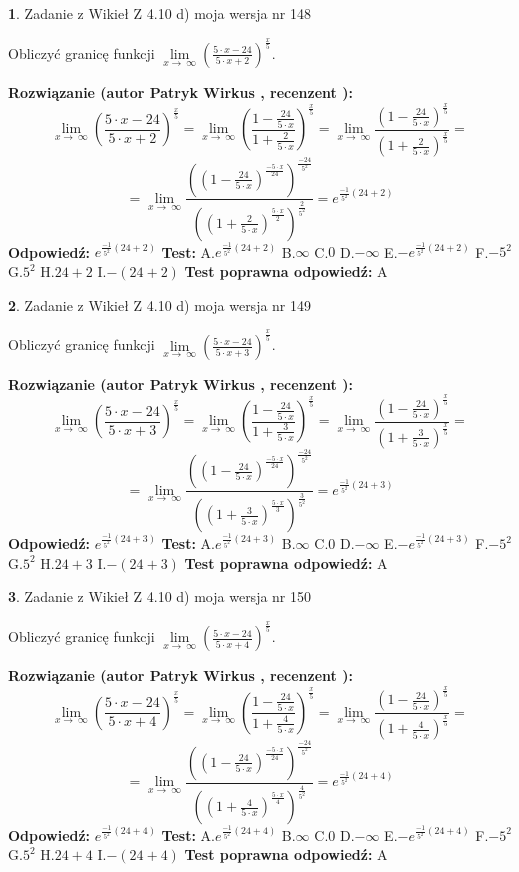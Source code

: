\documentclass[12pt, a4paper]{article}
\theoremstyle{definition} %
\newtheorem{zad}{}
\newcommand{\zadStart}[1]{\begin{zad}#1\newline}
\newcommand{\zadStop}{\end{zad}}
\newcommand{\rozwStart}[2]{\noindent \textbf{Rozwiązanie (autor #1 , recenzent #2): }\newline}
\newcommand{\rozwStop}{\newline}
\newcommand{\odpStart}{\noindent \textbf{Odpowiedź:}\newline}
\newcommand{\odpStop}{\newline}
\newcommand{\testStart}{\noindent \textbf{Test:}\newline}
\newcommand{\testStop}{\newline}
\newcommand{\kluczStart}{\noindent \textbf{Test poprawna odpowiedź:}\newline}
\newcommand{\kluczStop}{\newline}
\begin{document}
\zadStart{Zadanie z Wikieł Z 4.10 d) moja wersja nr 148}


Obliczyć granicę funkcji  $\lim\limits_{x\to\ \infty}(\frac{5\cdot x-24}{5\cdot x+2})^{\frac{x}{5}}$.
\zadStop
\rozwStart{Patryk Wirkus}{}
$$\lim\limits_{x\to\ \infty}(\frac{5\cdot x-24}{5\cdot x+2})^{\frac{x}{5}} = \lim\limits_{x\to\ \infty}(\frac{1-\frac{24}{5\cdot x}}{1+\frac{2}{5\cdot x}})^{\frac{x}{5}}=\lim\limits_{x\to\ \infty}\frac{(1-\frac{24}{5\cdot x})^{\frac{x}{5}}}{(1+\frac{2}{5\cdot x})^{\frac{x}{5}}}=$$
$$=\lim\limits_{x\to\ \infty}\frac{((1-\frac{24}{5\cdot x})^{\frac{-5\cdot x}{24}})^{\frac{-24}{5^{2}}}}{((1+\frac{2}{5\cdot x})^{\frac{5\cdot x}{2}})^{\frac{2}{5^{2}}}}=e^{\frac{-1}{5^{2}}(24+2)}$$
\rozwStop
\odpStart
$e^{\frac{-1}{5^{2}}(24+2)}$
\odpStop
\testStart
A.$e^{\frac{-1}{5^{2}}(24+2)}$ B.$\infty$ C.$0$ D.$-\infty$ E.$-e^{\frac{-1}{5^{2}}(24+2)}$
F.$-5^{2}$ G.$5^{2}$
H.$24+2$
I.$-(24+2)$
\testStop
\kluczStart
A
\kluczStop



\zadStart{Zadanie z Wikieł Z 4.10 d) moja wersja nr 149}


Obliczyć granicę funkcji  $\lim\limits_{x\to\ \infty}(\frac{5\cdot x-24}{5\cdot x+3})^{\frac{x}{5}}$.
\zadStop
\rozwStart{Patryk Wirkus}{}
$$\lim\limits_{x\to\ \infty}(\frac{5\cdot x-24}{5\cdot x+3})^{\frac{x}{5}} = \lim\limits_{x\to\ \infty}(\frac{1-\frac{24}{5\cdot x}}{1+\frac{3}{5\cdot x}})^{\frac{x}{5}}=\lim\limits_{x\to\ \infty}\frac{(1-\frac{24}{5\cdot x})^{\frac{x}{5}}}{(1+\frac{3}{5\cdot x})^{\frac{x}{5}}}=$$
$$=\lim\limits_{x\to\ \infty}\frac{((1-\frac{24}{5\cdot x})^{\frac{-5\cdot x}{24}})^{\frac{-24}{5^{2}}}}{((1+\frac{3}{5\cdot x})^{\frac{5\cdot x}{3}})^{\frac{3}{5^{2}}}}=e^{\frac{-1}{5^{2}}(24+3)}$$
\rozwStop
\odpStart
$e^{\frac{-1}{5^{2}}(24+3)}$
\odpStop
\testStart
A.$e^{\frac{-1}{5^{2}}(24+3)}$ B.$\infty$ C.$0$ D.$-\infty$ E.$-e^{\frac{-1}{5^{2}}(24+3)}$
F.$-5^{2}$ G.$5^{2}$
H.$24+3$
I.$-(24+3)$
\testStop
\kluczStart
A
\kluczStop



\zadStart{Zadanie z Wikieł Z 4.10 d) moja wersja nr 150}


Obliczyć granicę funkcji  $\lim\limits_{x\to\ \infty}(\frac{5\cdot x-24}{5\cdot x+4})^{\frac{x}{5}}$.
\zadStop
\rozwStart{Patryk Wirkus}{}
$$\lim\limits_{x\to\ \infty}(\frac{5\cdot x-24}{5\cdot x+4})^{\frac{x}{5}} = \lim\limits_{x\to\ \infty}(\frac{1-\frac{24}{5\cdot x}}{1+\frac{4}{5\cdot x}})^{\frac{x}{5}}=\lim\limits_{x\to\ \infty}\frac{(1-\frac{24}{5\cdot x})^{\frac{x}{5}}}{(1+\frac{4}{5\cdot x})^{\frac{x}{5}}}=$$
$$=\lim\limits_{x\to\ \infty}\frac{((1-\frac{24}{5\cdot x})^{\frac{-5\cdot x}{24}})^{\frac{-24}{5^{2}}}}{((1+\frac{4}{5\cdot x})^{\frac{5\cdot x}{4}})^{\frac{4}{5^{2}}}}=e^{\frac{-1}{5^{2}}(24+4)}$$
\rozwStop
\odpStart
$e^{\frac{-1}{5^{2}}(24+4)}$
\odpStop
\testStart
A.$e^{\frac{-1}{5^{2}}(24+4)}$ B.$\infty$ C.$0$ D.$-\infty$ E.$-e^{\frac{-1}{5^{2}}(24+4)}$
F.$-5^{2}$ G.$5^{2}$
H.$24+4$
I.$-(24+4)$
\testStop
\kluczStart
A
\kluczStop
\end{document}
